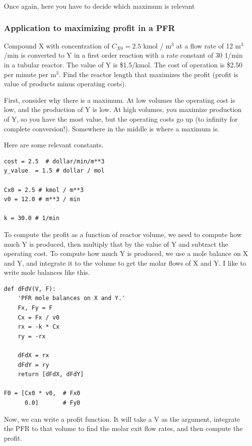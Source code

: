 \documentclass[11pt]{article}
\begin{document}
Once again, here you have to decide which maximum is relevant

\subsubsection{Application to maximizing profit in a PFR}
\label{sec:orgd24c437}

Compound X with concentration of \(C_{X0} = 2.5\) kmol / m\(^{\text{3}}\) at a flow rate of 12 m\(^{\text{3}}\)/min is converted to Y in a first order reaction with a rate constant of 30 1/min in a tubular reactor. The value of Y is \$1.5/kmol. The cost of operation is \$2.50 per minute per m\(^{\text{3}}\). Find the reactor length that maximizes the profit (profit is value of products minus operating costs).

First, consider why there is a maximum. At low volumes the operating cost is low, and the production of Y is low. At high volumes, you maximize production of Y, so you have the most value, but the operating costs go up (to infinity for complete conversion!). Somewhere in the middle is where a maximum is.

Here are some relevant constants.

\begin{verbatim}
cost = 2.5  # dollar/min/m**3
y_value  = 1.5 # dollar / mol

Cx0 = 2.5 # kmol / m**3
v0 = 12.0 # m**3 / min

k = 30.0 # 1/min
\end{verbatim}

To compute the profit as a function of reactor volume, we need to compute how much Y is produced, then multiply that by the value of Y and subtract the operating cost. To compute how much Y is produced, we use a mole balance on X and Y, and integrate it to the volume to get the molar flows of X and Y. I like to write mole balances like this.

\begin{verbatim}
def dFdV(V, F):
    'PFR mole balances on X and Y.'
    Fx, Fy = F
    Cx = Fx / v0
    rx = -k * Cx
    ry = -rx

    dFdX = rx
    dFdY = ry
    return [dFdX, dFdY]

F0 = [Cx0 * v0,  # Fx0
      0.0]       # Fy0
\end{verbatim}

Now, we can write a profit function. It will take a V as the argument, integrate the PFR to that volume to find the molar exit flow rates, and then compute the profit.
\end{document}
